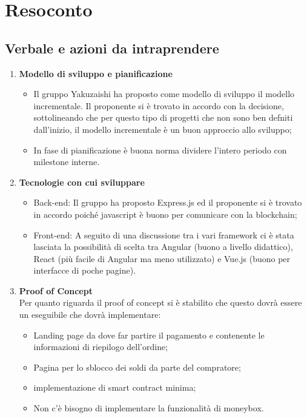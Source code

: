 \section{Resoconto}
\subsection{Verbale e azioni da intraprendere}

\begin{enumerate}
	\item \textbf{Modello di sviluppo e pianificazione}
	\begin{itemize}
		\item Il gruppo Yakuzaishi ha proposto come modello di sviluppo il modello incrementale. Il proponente si è trovato in accordo con la decisione, sottolineando che per questo tipo di progetti che non sono ben defniti dall'inizio, il modello incrementale è un buon approccio allo sviluppo;
		\item In fase di pianificazione è buona norma dividere l'intero periodo con milestone interne.
	\end{itemize}
	\item \textbf{Tecnologie con cui sviluppare}
	\begin{itemize}
		\item Back-end: Il gruppo ha proposto Express.js ed il proponente si è trovato in accordo poiché javascript è buono per comunicare con la blockchain;
		\item Front-end: A seguito di una discussione tra i vari framework ci è stata lasciata la possibilità di scelta tra Angular\glo{} (buono a livello didattico), React (più facile di Angular\glo{} ma meno utilizzato) e Vue.js (buono per interfacce di poche pagine).
	\end{itemize}
	\item \textbf{Proof of Concept}\\
		Per quanto riguarda il proof of concept si è stabilito che questo dovrà essere un eseguibile che dovrà implementare:
	\begin{itemize}
		\item Landing page da dove far partire il pagamento e contenente le informazioni di riepilogo dell'ordine;
		\item Pagina per lo sblocco dei soldi da parte del compratore;
		\item implementazione di smart contract minima;
		\item Non c'è bisogno di implementare la funzionalità di moneybox.
	\end{itemize}

\end{enumerate}
